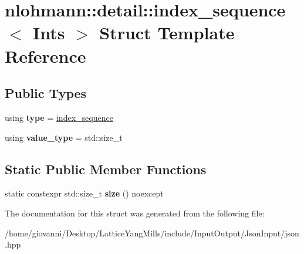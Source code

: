 \hypertarget{structnlohmann_1_1detail_1_1index__sequence}{}\section{nlohmann\+:\+:detail\+:\+:index\+\_\+sequence$<$ Ints $>$ Struct Template Reference}
\label{structnlohmann_1_1detail_1_1index__sequence}
\subsection*{Public Types}
\begin{DoxyCompactItemize}
\item 
using {\bfseries type} = \hyperlink{structnlohmann_1_1detail_1_1index__sequence}{index\+\_\+sequence}\hypertarget{structnlohmann_1_1detail_1_1index__sequence_a3c14c4ab277de72b166806193ff4fa10}{}\label{structnlohmann_1_1detail_1_1index__sequence_a3c14c4ab277de72b166806193ff4fa10}

\item 
using {\bfseries value\+\_\+type} = std\+::size\+\_\+t\hypertarget{structnlohmann_1_1detail_1_1index__sequence_a2eca43d08fc1eb68bd5fa75b6714d21d}{}\label{structnlohmann_1_1detail_1_1index__sequence_a2eca43d08fc1eb68bd5fa75b6714d21d}

\end{DoxyCompactItemize}
\subsection*{Static Public Member Functions}
\begin{DoxyCompactItemize}
\item 
static constexpr std\+::size\+\_\+t {\bfseries size} () noexcept\hypertarget{structnlohmann_1_1detail_1_1index__sequence_a7ac529419787d775f52408135304b337}{}\label{structnlohmann_1_1detail_1_1index__sequence_a7ac529419787d775f52408135304b337}

\end{DoxyCompactItemize}


The documentation for this struct was generated from the following file\+:\begin{DoxyCompactItemize}
\item 
/home/giovanni/\+Desktop/\+Lattice\+Yang\+Mills/include/\+Input\+Output/\+Json\+Input/json.\+hpp\end{DoxyCompactItemize}
